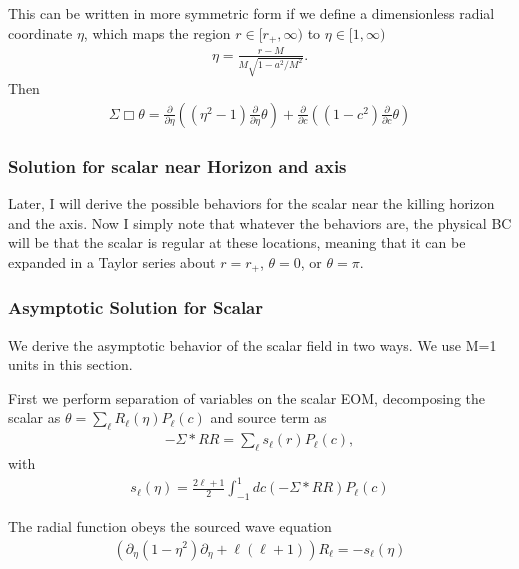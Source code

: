 \documentclass[aps,prd,amsmath,showpacs,amssymb,superscriptaddress,nofootinbib,longbibliography,eqsecnum,preprintnumbers]{revtex4-1}
\begin{document}
This can be written in more symmetric form if we define a dimensionless radial coordinate $\eta$, which maps the region $r\in [r_+,\infty)$ to $\eta \in [1,\infty)$
\begin{align}
\eta=\frac{r-M}{M\sqrt{1-a^2/M^2}}.
\end{align}
Then 
\begin{align}
\Sigma \Box \theta= \frac{\partial}{\partial \eta}\left((\eta^2-1)\frac{\partial }{\partial \eta}\theta\right) + \frac{\partial}{\partial c}\left((1-c^2) \frac{\partial }{\partial c}\theta\right)
\end{align}
\subsubsection{Solution for scalar near Horizon and axis}
Later, I will derive the possible behaviors for the scalar near the killing horizon and the axis. Now I simply note that whatever the behaviors are, the physical BC will be that the scalar is regular at these locations, meaning that it can be expanded in a Taylor series about $r= r_+$, $\theta =0$, or $\theta = \pi$.
\subsubsection{Asymptotic Solution for Scalar}
We derive the asymptotic behavior of the scalar field in two ways.  We use M=1 units in this section.

First we perform separation of variables on the scalar EOM, decomposing the scalar as $\theta = \sum_{\ell}R_\ell(\eta)P_{\ell}(c)$ and source term as
\begin{align}
-\Sigma *RR=\sum_{\ell}s_{\ell}(r)P_\ell(c),
\end{align}
with 
\begin{align}
s_{\ell}(\eta)=\frac{2\ell+1}{2}\int_{-1}^1dc\left(-\Sigma *RR\right)P_{\ell}(c)
\end{align}

The radial function obeys the sourced wave equation
\begin{align}
\left(\partial_\eta(1-\eta^2)\partial_\eta+\ell(\ell+1)\right)R_\ell=-s_{\ell}(\eta) \label{eq:Rad}
\end{align}
\end{document}
